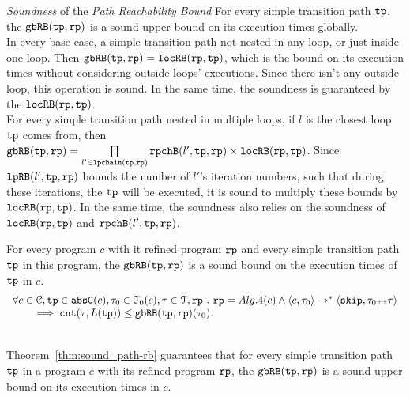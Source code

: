 \emph{Soundness} of the \emph{Path Reachability Bound}  
For every simple transition path $\mathtt{tp}$, the $\mathtt{gbRB}(\mathtt{tp}, \mathtt{rp})$
is a sound upper bound on its execution times globally.
\\
In every base case, a simple transition path not nested in any loop, or just inside one loop.
Then $\mathtt{gbRB}(\mathtt{tp}, \mathtt{rp}) = \mathtt{locRB}(\mathtt{rp}, \mathtt{tp})$, which is the bound on its execution times without considering
outside loops' executions. Since there isn't any outside loop, this operation is sound.
In the same time, the soundness is guaranteed by the $\mathtt{locRB}(\mathtt{rp}, \mathtt{tp})$.
\\
For every simple transition path nested in multiple loops, if $l$ is the closest loop $\mathtt{tp}$ comes from, then
$\mathtt{gbRB}(\mathtt{tp}, \mathtt{rp}) =
\prod\limits_{l' \in \mathtt{lpchain}(\mathtt{tp}, \mathtt{rp})} \mathtt{rpchB}(l', \mathtt{tp}, \mathtt{rp}) \times \mathtt{locRB}(\mathtt{rp}, \mathtt{tp})$.
Since $\mathtt{lpRB}(l', \mathtt{tp}, \mathtt{rp})$ bounds the number of $l'$'s iteration numbers,
such that during these iterations, the $\mathtt{tp}$ will be executed,
it is sound to multiply these bounds by $\mathtt{locRB}(\mathtt{rp}, \mathtt{tp})$.
In the same time, the soundness also relies on the soundness of $\mathtt{locRB}(\mathtt{rp}, \mathtt{tp})$ and $\mathtt{rpchB}(l', \mathtt{tp}, \mathtt{rp})$. 
%
\begin{thm}
  \label{thm:sound_path-rb}
  For every program $c$ with it refined program $\mathtt{rp}$ and 
  every simple transition path $\mathtt{tp}$ in this program,
   the $\mathtt{gbRB}(\mathtt{tp}, \mathtt{rp})$
is a sound bound on the execution times of $\mathtt{tp}$ in $c$.
  \[
    \begin{array}{l}
    \forall c \in \mathcal{C}, \mathtt{tp} \in \mathtt{abs}{\mathtt{G}}(c), \mathtt{\tau}_0 \in \mathcal{T}_0(c), \mathtt{\tau} \in \mathcal{T}, \mathtt{rp} ~.~ 
    \mathtt{rp} = Alg.4(c)
    \land
    \langle c, \mathtt{\tau}_0 \rangle \to^* 
    \langle {\ensuremath{\mathtt{skip}}, \ensuremath{\mathtt{\tau}}_0 {\scriptscriptstyle ++}\ensuremath{\mathtt{\tau}}} \rangle
    \\ \qquad
    \implies
    \mathtt{cnt}(\mathtt{\tau}, L(\mathtt{tp})) \leq \mathtt{gbRB}(\mathtt{tp}, \mathtt{rp})(\mathtt{\tau}_0).
    \end{array}
    \]
\end{thm}
\\
Theorem~\ref{thm:sound_path-rb} guarantees that
for every simple transition path $\mathtt{tp}$ in a program $c$ with its refined program $\mathtt{rp}$,
the $\mathtt{gbRB}(\mathtt{tp}, \mathtt{rp})$
is a sound upper bound on its execution times in $c$.
